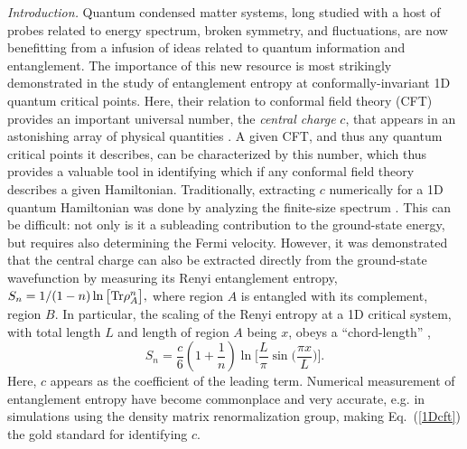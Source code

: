 \documentclass[prl,aps,twocolumn,floatfix,amsmath,amssymb,superscriptaddress,tightenlines]{revtex4}
\begin{document}
{\it Introduction.} Quantum condensed matter systems, long studied with a host of probes related to energy spectrum, broken symmetry,
and fluctuations, are now benefitting from a infusion of ideas related to quantum information and entanglement.
The importance of this new resource is most strikingly 
demonstrated in the study of entanglement entropy at conformally-invariant 1D quantum critical points.
Here, their relation to conformal field theory (CFT) provides an important
universal number, the {\it central charge} $c$, that appears in an astonishing array of physical
quantities \cite{Cardyubiquitous}. A given CFT, and
thus any quantum critical points it describes, can be
characterized by this number,
which thus provides a valuable tool in identifying which if any conformal field
theory describes a given Hamiltonian. 
Traditionally, extracting $c$ numerically for a 1D quantum
Hamiltonian was done by analyzing the finite-size spectrum
\cite{BCN,Affleck}.  This can be difficult: not only is it a
subleading contribution to the ground-state energy, but requires also
determining the Fermi velocity.
However, it was demonstrated \cite{Holzhey, VidalC} that the central charge can also be extracted 
directly from the ground-state wavefunction by measuring its Renyi
entanglement entropy, $ S_n = 1/(1-n) \ln \big[ {\rm Tr} \rho_A^n
\big], $ where region $A$ is entangled with its complement, region
$B$.  In particular, the scaling of the Renyi entropy at a 1D critical system,
with total length $L$ and length of region $A$ being $x$, obeys a ``chord-length''  \cite{Korepin,Cardy},
\begin{equation}
S_n = \frac{c}{6}\left({1+ \frac{1}{n} }\right) \ln\Big[ \frac{L}{\pi} \sin\big( \frac{\pi x}{L} \big) \Big]. \label{1Dcft}
\end{equation}
Here, $c$ appears as the coefficient of the leading
term.  
Numerical measurement of entanglement entropy have become commonplace and 
very accurate, e.g. in simulations using the density matrix renormalization group,
making Eq.~(\ref{1Dcft}) the gold standard for identifying $c$.
\end{document}
